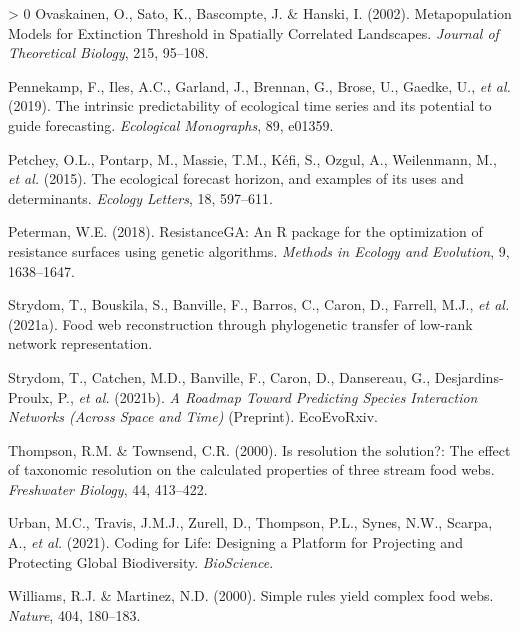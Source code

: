 \documentclass[10pt,oneside]{article}
\newlength{\cslhangindent}
\newenvironment{CSLReferences}[3] %
 {%
  \setlength{\parindent}{0pt}
  \ifodd #1 \everypar{\setlength{\hangindent}{\cslhangindent}}\ignorespaces\fi
  \ifnum #2 > 0
  \setlength{\parskip}{#2\baselineskip}
  \fi
 }%
 {}
\begin{document}
\begin{CSLReferences}{1}{0}
\leavevmode\hypertarget{ref-Ovaskainen2002MetMod}{}%
Ovaskainen, O., Sato, K., Bascompte, J. \& Hanski, I. (2002).
Metapopulation Models for Extinction Threshold in Spatially Correlated
Landscapes. \emph{Journal of Theoretical Biology}, 215, 95--108.

\leavevmode\hypertarget{ref-Pennekamp2019IntPre}{}%
Pennekamp, F., Iles, A.C., Garland, J., Brennan, G., Brose, U., Gaedke,
U., \emph{et al.} (2019). The intrinsic predictability of ecological
time series and its potential to guide forecasting. \emph{Ecological
Monographs}, 89, e01359.

\leavevmode\hypertarget{ref-Petchey2015EcoFor}{}%
Petchey, O.L., Pontarp, M., Massie, T.M., Kéfi, S., Ozgul, A.,
Weilenmann, M., \emph{et al.} (2015). The ecological forecast horizon,
and examples of its uses and determinants. \emph{Ecology Letters}, 18,
597--611.

\leavevmode\hypertarget{ref-Peterman2018ResRP}{}%
Peterman, W.E. (2018). ResistanceGA: An R package for the optimization
of resistance surfaces using genetic algorithms. \emph{Methods in
Ecology and Evolution}, 9, 1638--1647.

\leavevmode\hypertarget{ref-Strydom2021FooWeb}{}%
Strydom, T., Bouskila, S., Banville, F., Barros, C., Caron, D., Farrell,
M.J., \emph{et al.} (2021a). Food web reconstruction through
phylogenetic transfer of low-rank network representation.

\leavevmode\hypertarget{ref-Strydom2021RoaPre}{}%
Strydom, T., Catchen, M.D., Banville, F., Caron, D., Dansereau, G.,
Desjardins-Proulx, P., \emph{et al.} (2021b). \emph{A Roadmap Toward
Predicting Species Interaction Networks (Across Space and Time)}
(Preprint). EcoEvoRxiv.

\leavevmode\hypertarget{ref-Thompson2000ResSol}{}%
Thompson, R.M. \& Townsend, C.R. (2000). Is resolution the solution?:
The effect of taxonomic resolution on the calculated properties of three
stream food webs. \emph{Freshwater Biology}, 44, 413--422.

\leavevmode\hypertarget{ref-Urban2021CodLif}{}%
Urban, M.C., Travis, J.M.J., Zurell, D., Thompson, P.L., Synes, N.W.,
Scarpa, A., \emph{et al.} (2021). Coding for Life: Designing a Platform
for Projecting and Protecting Global Biodiversity. \emph{BioScience}.

\leavevmode\hypertarget{ref-Williams2000SimRul}{}%
Williams, R.J. \& Martinez, N.D. (2000). Simple rules yield complex food
webs. \emph{Nature}, 404, 180--183.

\end{CSLReferences}
\end{document}
